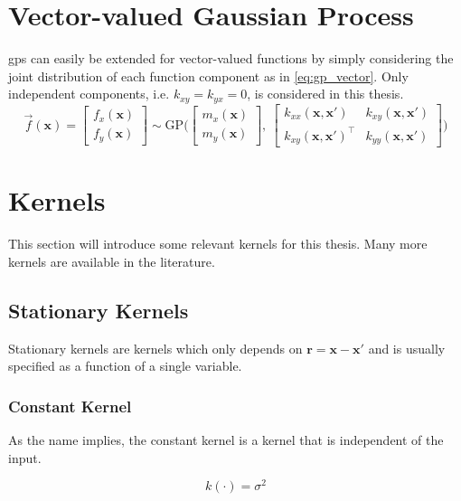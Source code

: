 \section{Vector-valued Gaussian Process}\label{sec:theory_vector_gp}
\acrshort{gp}s can easily be extended for vector-valued functions by simply considering the joint distribution of each function component as in \cref{eq:gp_vector}. Only independent components, i.e. $k_{xy}=k_{yx}=0$, is considered in this thesis.
\begin{equation}\label{eq:gp_vector}
     \vec{f}(\boldsymbol{x}) = \begin{bmatrix} f_x (\boldsymbol{x})\\ f_y (\boldsymbol{x})\end{bmatrix} \sim \text{GP} \big(\begin{bmatrix} m_x(\boldsymbol{x})\\m_y(\boldsymbol{x})\end{bmatrix}, \ \begin{bmatrix}
    k_{xx}(\boldsymbol{x}, \boldsymbol{x}') & k_{xy}(\boldsymbol{x}, \boldsymbol{x}') \\ k_{xy}(\boldsymbol{x}, \boldsymbol{x}')^\intercal & k_{yy}(\boldsymbol{x}, \boldsymbol{x}')
    \end{bmatrix}\big) 
\end{equation}

\section{Kernels}\label{sec:kernels}
This section will introduce some relevant kernels for this thesis. Many more kernels are available in the literature. 
\subsection{Stationary Kernels}
Stationary kernels are kernels which only depends on $\boldsymbol{r} = \boldsymbol{x} - \boldsymbol{x'}$ and is usually specified as a function of a single variable.
\subsubsection{Constant Kernel}
As the name implies, the constant kernel is a kernel that is independent of the input.

\begin{equation}
    k(\boldsymbol{\cdot}) = \sigma^2
\end{equation}

